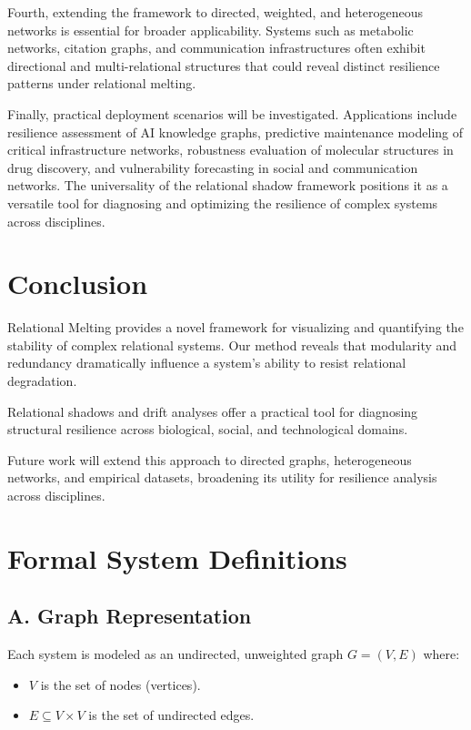 \documentclass[conference]{IEEEtran}
\begin{document}
Fourth, extending the framework to directed, weighted, and heterogeneous networks is essential for broader applicability. Systems such as metabolic networks, citation graphs, and communication infrastructures often exhibit directional and multi-relational structures that could reveal distinct resilience patterns under relational melting.

Finally, practical deployment scenarios will be investigated. Applications include resilience assessment of AI knowledge graphs, predictive maintenance modeling of critical infrastructure networks, robustness evaluation of molecular structures in drug discovery, and vulnerability forecasting in social and communication networks. The universality of the relational shadow framework positions it as a versatile tool for diagnosing and optimizing the resilience of complex systems across disciplines.
\section{Conclusion}
Relational Melting provides a novel framework for visualizing and quantifying the stability of complex relational systems.  
Our method reveals that modularity and redundancy dramatically influence a system's ability to resist relational degradation.

Relational shadows and drift analyses offer a practical tool for diagnosing structural resilience across biological, social, and technological domains.

Future work will extend this approach to directed graphs, heterogeneous networks, and empirical datasets, broadening its utility for resilience analysis across disciplines.

\appendices
\section{Formal System Definitions}

\subsection*{\textbf{A. Graph Representation}}
Each system is modeled as an undirected, unweighted graph $G = (V, E)$ where:
\begin{itemize}
    \item $V$ is the set of nodes (vertices).
    \item $E \subseteq V \times V$ is the set of undirected edges.
\end{itemize}
\end{document}
